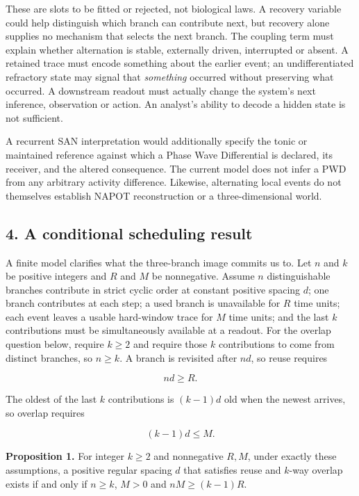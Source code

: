 \documentclass[
  american,
  11pt,
  letterpaper,
]{article}
\begin{document}
These are slots to be fitted or rejected, not biological laws. A recovery variable could help distinguish which branch can contribute next, but recovery alone supplies no mechanism that selects the next branch. The coupling term must explain whether alternation is stable, externally driven, interrupted or absent. A retained trace must encode something about the earlier event; an undifferentiated refractory state may signal that \emph{something} occurred without preserving what occurred. A downstream readout must actually change the system's next inference, observation or action. An analyst's ability to decode a hidden state is not sufficient.

A recurrent SAN interpretation would additionally specify the tonic or maintained reference against which a Phase Wave Differential is declared, its receiver, and the altered consequence. The current model does not infer a PWD from any arbitrary activity difference. Likewise, alternating local events do not themselves establish NAPOT reconstruction or a three-dimensional world.

\subsection{4. A conditional scheduling result}\label{a-conditional-scheduling-result}

A finite model clarifies what the three-branch image commits us to. Let \(n\) and \(k\) be positive integers and \(R\) and \(M\) be nonnegative. Assume \(n\) distinguishable branches contribute in strict cyclic order at constant positive spacing \(d\); one branch contributes at each step; a used branch is unavailable for \(R\) time units; each event leaves a usable hard-window trace for \(M\) time units; and the last \(k\) contributions must be simultaneously available at a readout. For the overlap question below, require \(k\geq 2\) and require those \(k\) contributions to come from distinct branches, so \(n\geq k\). A branch is revisited after \(nd\), so reuse requires

\[
nd\geq R.
\tag{5}
\]

The oldest of the last \(k\) contributions is \((k-1)d\) old when the newest arrives, so overlap requires

\[
(k-1)d\leq M.
\tag{6}
\]

\textbf{Proposition 1.} For integer \(k\geq 2\) and nonnegative \(R,M\), under exactly these assumptions, a positive regular spacing \(d\) that satisfies reuse and \(k\)-way overlap exists if and only if \(n\geq k\), \(M>0\) and \(nM\geq(k-1)R\).
\end{document}
